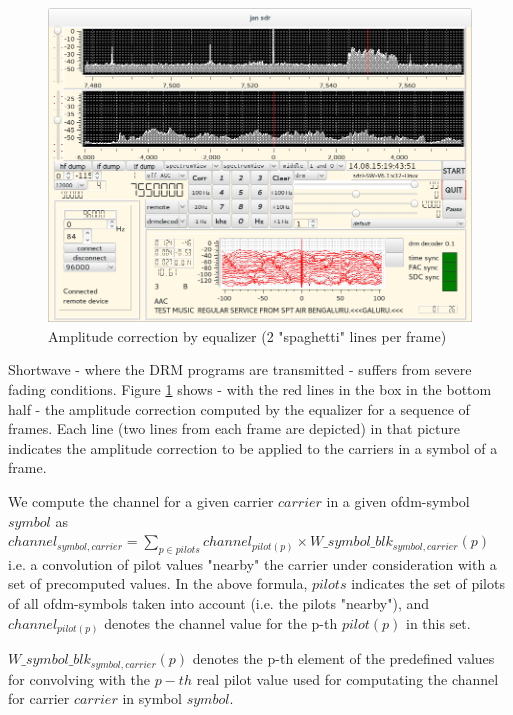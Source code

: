 \documentclass[11pt]{article}
\begin{document}
\begin{figure}[ht]
\begin{center}
\includegraphics[width=140mm]{screenshot-3.png}
\caption{Amplitude correction by equalizer (2 "spaghetti" lines per frame)}
\label{fig:equalizer}
\end{center}
\end{figure}

Shortwave - where the DRM programs are transmitted - suffers from
severe fading conditions. Figure \ref{fig:equalizer} shows - with the
red lines in the box in the bottom half - the amplitude
correction computed by the equalizer for a sequence of frames.
Each line (two lines from each frame are depicted) in that
picture indicates the amplitude correction 
to be applied to the carriers in a symbol of a frame.

We compute the channel for a given carrier $carrier$ in
a given ofdm-symbol $symbol$ as
{
\ \\
$channel_{symbol, carrier} = \sum_{p \in pilots} channel_{pilot(p)} \times W\_symbol\_blk_{symbol, carrier} (p)$
\ \\
}
i.e. a convolution of pilot values "nearby" the carrier under consideration
with a set of precomputed values.
In the above formula, $pilots$ indicates the set of
pilots of all ofdm-symbols taken
into account (i.e. the pilots "nearby"),
and $channel_{pilot(p)}$ denotes the channel value for  the p-th $pilot (p)$
in this set.

$W\_symbol\_blk_{symbol, carrier} (p)$ denotes the  p-th element of the
predefined values for convolving with the $p-th$ real pilot value
used for computating the channel for carrier $carrier$ in
symbol $symbol$. 
\end{document}
